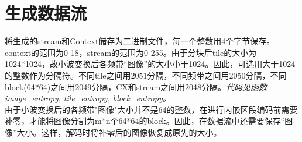 \section{生成数据流}
将生成的stream和Context储存为二进制文件，每一个整数用4个字节保存。context的范围为0-18，stream的范围为0-255。由于分块后tile的大小为1024*1024，故小波变换后各频带“图像”的大小小于1024。因此，可选用大于1024的整数作为分隔符。不同tile之间用2051分隔，不同频带之间用2050分隔，不同block(64*64)之间用2049分隔，CX和stream之间用2048分隔。\textit{代码见函数image\_entropy, tile\_entropy, block\_entropy。}\\ 
\indent 由于小波变换后的各频带"图像"大小并不是64的整数，在进行内嵌区段编码前需要补零，才能将图像分割为m*n个64*64的block。因此，在数据流中还需要保存“图像”大小。这样，解码时将补零后的图像恢复成原先的大小。